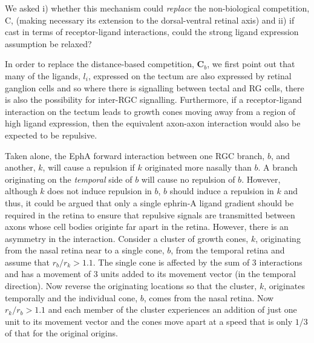 \documentclass[11pt, a4paper, draft]{article}
\begin{document}
We asked i) whether this mechanism could \emph{replace} the non-biological
competition, C, (making necessary its extension to the dorsal-ventral retinal
axis) and ii) if cast in terms of receptor-ligand interactions, could the
strong ligand expression assumption be relaxed?





In order to replace the distance-based competition, $\mathbf{C}_b$, we first
point out that many of the ligands, $l_i$, expressed on the tectum are also
expressed by retinal ganglion cells and so where there is signalling between
tectal and RG cells, there is also the possibility for inter-RGC
signalling. Furthermore, if a receptor-ligand interaction on the tectum leads
to growth cones moving away from a region of high ligand expression, then the
equivalent axon-axon interaction would also be expected to be repulsive.

Taken alone, the EphA forward interaction between one RGC branch, $b$, and
another, $k$, will cause a repulsion if $k$ originated more nasally than
$b$. A branch originating on the \emph{temporal} side of $b$ will cause no
repulsion of $b$. However, although $k$ does not induce repulsion in $b$, $b$
should induce a repulsion in $k$ and thus, it could be argued that only a
single ephrin-A ligand gradient should be required in the retina to ensure
that repulsive signals are transmitted between axons whose cell bodies
originte far apart in the retina. However, there is an asymmetry in the
interaction. Consider a cluster of growth cones, $k$, originating from the
nasal retina near to a single cone, $b$, from the temporal retina and assume
that $r_b/r_k>1.1$. The single cone is affected by the sum of 3 interactions
and has a movement of 3 units added to its movement vector (in the temporal
direction). Now reverse the originating locations so that the cluster, $k$,
originates temporally and the individual cone, $b$, comes from the nasal
retina. Now $r_k/r_b>1.1$ and each member of the cluster experiences an
addition of just one unit to its movement vector and the cones move apart at a
speed that is only $1/3$ of that for the original origins.
\end{document}
